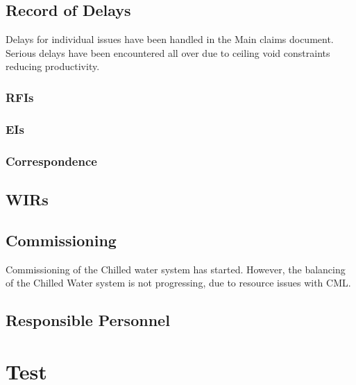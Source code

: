 \section{Record of Delays}
Delays for individual issues have been handled in the Main claims document. Serious delays have been encountered all over due to ceiling void constraints reducing productivity. 
\subsection{RFIs}
\subsection{EIs}
\subsection{Correspondence}

\section{WIRs}

\section{Commissioning}

Commissioning of the Chilled water system has started. However, the balancing of the Chilled Water system is not progressing, due to resource issues with CML.

\section{Responsible Personnel}


\appendix

\chapter{Test}














